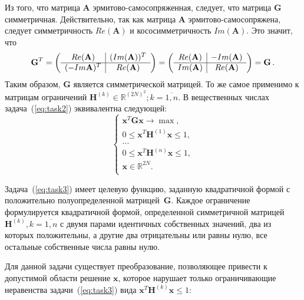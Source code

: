 Из того, что матрица $\textbf{A}$ эрмитово-самосопряженная, следует, что матрица $\textbf{G}$ симметричная. Действительно, так как матрица $\textbf{A}$ эрмитово-самосопряжена, следует симметричность $Re(\textbf{A})$ и кососимметричность $Im(\textbf{A})$. Это значит, что
%
    $$
        \textbf{G}^T = \left( \begin{array}{c | c}
            Re(\textbf{A}) & (Im(\textbf{A}))^T \\
            \hline
            (-Im \textbf{A})^T & Re(\textbf{A}) \end{array}
        \right) = \left( \begin{array}{c | c}
            Re(\textbf{A}) & -Im(\textbf{A}) \\
            \hline
            Im(\textbf{A}) & Re(\textbf{A}) \end{array}
        \right)= \textbf{G} \, .
    $$
%
Таким образом, $\textbf{G}$ является симметрической матрицей. То же самое применимо к матрицам ограничений $\textbf{H}^{(k)} \in \mathbb{R}^{(2N)^2}; k=\overline{1,n}$. В вещественных числах задача~(\ref{eq:task2}) эквивалентна следующей:
        \begin{equation}
            \begin{cases}
               \textbf{x}^{T}\textbf{Gx} \rightarrow \max,\\
               0 \leq \textbf{x}^{T}\textbf{H}^{(1)}\textbf{x} \leq 1,\\
               ...\\
               0 \leq \textbf{x}^{T}\textbf{H}^{(n)}\textbf{x} \leq 1,\\
              \textbf{x} \in \mathbb{R}^{2N}.\\
             \end{cases}
             \label{eq:task3}
        \end{equation}

Задача~(\ref{eq:task3}) имеет целевую функцию, заданную квадратичной формой с положительно полуопределенной матрицей~$\textbf{G}$. Каждое ограничение формулируется квадратичной формой, определенной симметричной матрицей~$\textbf{H}^{(k)}, k=\overline{1,n}$ с двумя парами идентичных собственных значений, два из которых положительны, а другие два отрицательны или равны нулю, все остальные собственные числа равны нулю.

Для данной задачи существует преобразование, позволяющее привести к допустимой области решение $\textbf{x}$, которое нарушает только ограничивающие неравенства задачи~(\ref{eq:task3}) вида $\textbf{x}^{T}\textbf{H}^{(k)}\textbf{x} \leq 1$:

